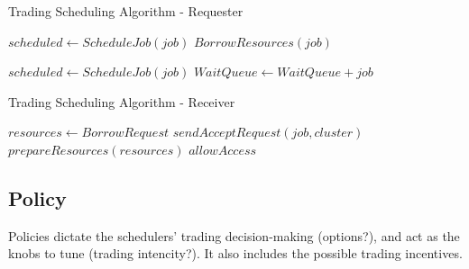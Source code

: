 \begin{algorithm}
\caption{Trading Scheduling Algorithm - Requester}
\begin{algorithmic}
     
        \State $scheduled \gets ScheduleJob(job)$
        \State $BorrowResources(job)$
        \EndIf
    \EndFor

     
        \State $scheduled \gets ScheduleJob(job)$
        \State $WaitQueue \gets WaitQueue + job$
        \EndIf
    \EndFor
\end{algorithmic}
\end{algorithm}

\begin{algorithm}
    \caption{Trading Scheduling Algorithm - Receiver}
    \begin{algorithmic}
            \State $ resources \gets BorrowRequest $ 
             
            \State $sendAcceptRequest(job, cluster)$
            \State $prepareResources(resources)$
            \State $allowAccess$
            \EndIf
    \end{algorithmic}
    \end{algorithm} 



\subsection{Policy} \label{policy}
Policies dictate the schedulers' trading decision-making (options?), and 
act as the knobs to tune (trading intencity?). It also includes the possible trading incentives.


